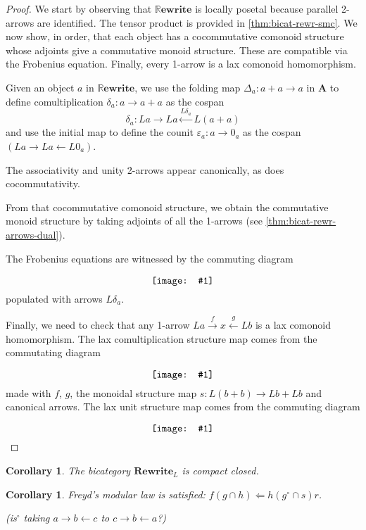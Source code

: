 \documentclass{amsart}
\renewcommand{\epsilon}{\varepsilon}
\newcommand{\A}{\cat{A}}
\newcommand{\cat}[1]{\mathbf{#1}}
\newcommand{\from}{\colon}
\newcommand{\xto}[1]{\xrightarrow{#1}}
\newcommand{\xgets}[1]{\xleftarrow{#1}}
\newcommand{\diagram}[1]{\raisebox{-0.5\height}{\texttt{[image: \#1]}}}
\newcommand{\Rewrite}{\mathbf{Rewrite} }
\newcommand{\RRewrite}{ \mathbb{R}\mathbf{ewrite} }
\newcommand{\edit}[1]{\textcolor{editcolour}{(#1)}}
\newtheorem{corollary}[theorem]{Corollary}
\theoremstyle{remark}
\theoremstyle{definition}
\begin{document}
\begin{proof}
  We start by observing that $ \RRewrite $ is locally posetal because
  parallel 2-arrows are identified. The tensor product is provided in
  \ref{thm:bicat-rewr-smc}. We now show, in order, that each object
  has a cocommutative comonoid structure whose adjoints give a
  commutative monoid structure.  These are compatible via the
  Frobenius equation. Finally, every 1-arrow is a lax comonoid
  homomorphism.
	
  Given an object $ a $ in $ \RRewrite $, we use the folding map
  $ \Delta_{a} \from a + a \to a $ in $ \A $ to define
  comultiplication $ \delta_a \from a \to a + a $ as the cospan
  \[
    \delta_a \from La \to La \xgets{L\delta_a} L(a + a)
  \]
  and use the initial map to define the counit
  $ \epsilon_a \from a \to 0_a $ as the cospan
  \( (La \to La \gets L0_a) \).
  
  The associativity and unity 2-arrows appear canonically, as does
  cocommutativity.
	
  From that cocommutative comonoid structure, we obtain the
  commutative monoid structure by taking adjoints of all the 1-arrows
  (see \ref{thm:bicat-rewr-arrows-dual}).
	
  The Frobenius equations are witnessed by the commuting diagram
  \[
    \diagram{diag_nlr_bi-rewrite-frobenius}
  \]
  populated with arrows $ L \delta_a $.
	
  Finally, we need to check that any 1-arrow
  $ La \xto{f} x \xgets{g} Lb $ is a lax comonoid homomorphism. The
  lax comultiplication structure map comes from the commutating
  diagram
  \[
    \diagram{diag_nlr_bi-rewrite-lax-comul}
  \]
  made with $ f $, $ g $, the monoidal structure map
  $ s \from L(b+b) \to Lb+Lb $ and canonical arrows. The lax unit
  structure map comes from the commuting diagram
  \[
    \diagram{diag_nlr_bi-rewrite-lax-counit} \qedhere
  \]
\end{proof}

\begin{corollary} \label{thm:bit-rewr-comp-closed}
  The bicategory $ \Rewrite_L$ is compact closed.
\end{corollary}

\begin{corollary} \label{thm:bicat-rewr-freyds-modular}
  Freyd's modular law is satisfied:
  $ f (g \cap h) \Leftarrow h ( g^\circ \cap s ) r $.

  \edit{is$ ^\circ $ taking $ a \to b \gets c $ to
    $ c \to b\gets a $?}
\end{corollary} 
\end{document}
